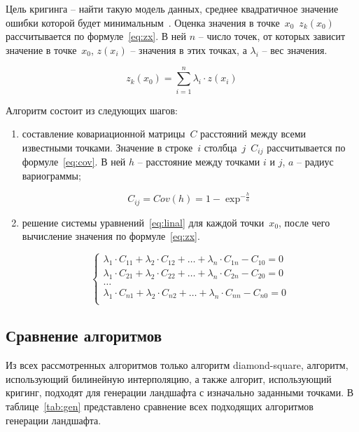 Цель кригинга – найти такую модель данных, среднее квадратичное значение ошибки которой будет минимальным~\cite{criging}. Оценка значения в точке~$x_0$~$z_k(x_0)$ рассчитывается по формуле~\ref{eq:zx}. В ней $n$ -- число точек, от которых зависит значение в точке~$x_0$, $z(x_i)$ -- значения в этих точках, а $\lambda_i$ -- вес значения.

\begin{equation}
	\label{eq:zx}
	z_k(x_0) = \sum_{i=1}^{n}\lambda_i \cdot z(x_i)
\end{equation}

Алгоритм состоит из следующих шагов:

\begin{enumerate}
	\item составление ковариационной матрицы~$C$ расстояний между всеми известными точками. Значение в строке~$i$ столбца~$j$~$C_{ij}$ рассчитывается по формуле~\ref{eq:cov}. В ней $h$ -- расстояние между точками $i$ и $j$, $a$ -- радиус вариограммы;
	
\begin{equation}
	\label{eq:cov}
	C_{ij} = Cov(h) = 1 - \exp^{-\frac{h}{a}}
\end{equation}
	
	\item решение системы уравнений~\ref{eq:linal} для каждой точки~$x_0$, после чего вычисление значения по формуле~\ref{eq:zx}.
	
\begin{equation}
	\label{eq:linal}
	\begin{cases}
		\lambda_1 \cdot C_{11} + \lambda_2 \cdot C_{12} + \ldots + \lambda_n \cdot C_{1n} - C_{10} = 0\\
		\lambda_1 \cdot C_{21} + \lambda_2 \cdot C_{22} + \ldots + \lambda_n \cdot C_{2n} - C_{20} = 0\\
		\ldots\\
		\lambda_1 \cdot C_{n1} + \lambda_2 \cdot C_{n2} + \ldots + \lambda_n \cdot C_{nn} - C_{n0} = 0\\
	\end{cases}
\end{equation}

\end{enumerate}

\subsection{Сравнение алгоритмов}

Из всех рассмотренных алгоритмов только алгоритм diamond-square, алгоритм, использующий билинейную интерполяцию, а также алгорит, использующий кригинг, подходят для генерации ландшафта с изначально заданными точками. В таблице~\ref{tab:gen} представлено сравнение всех подходящих алгоритмов генерации ландшафта.

